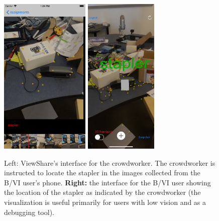 \documentclass[chi_draft]{sigchi}
\newcommand{\BVI}{B/VI\xspace}
\begin{document}
\begin{figure}
\begin{center}
\includegraphics[height=3in]{Figures/viewshare_crowdworker}\hspace{.01\linewidth}
\includegraphics[height=3in]{Figures/viewshare_user}
\end{center}
\caption{Left: ViewShare's interface for the crowdworker.  The crowdworker is instructed to locate the stapler in the images collected from the \BVI user's phone.  \textbf{Right:} the interface for the \BVI user showing the location of the stapler as indicated by the crowdworker (the visualization is useful primarily for users with low vision and as a debugging tool).\label{fig:viewsharescreenshots}}
\end{figure}
\end{document}
